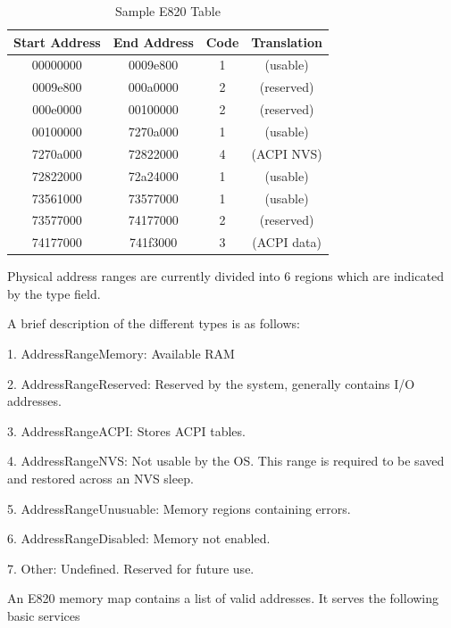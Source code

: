 \setlength{\belowcaptionskip}{-10pt}

\begin{table}[H]
  \centering
  \begin{tabular}{|c|c|c|c|}
      \hline
      Start Address & End Address & Code & Translation \\
      \hline 
      \hline
      00000000 & 0009e800 & 1 & (usable) \\
      \hline 
      0009e800 & 000a0000 & 2 & (reserved) \\
      \hline 
      000e0000 & 00100000 & 2 & (reserved) \\
      \hline 
      00100000 & 7270a000 & 1 & (usable) \\
      \hline 
      7270a000 & 72822000 & 4 & (ACPI NVS) \\
      \hline 
      72822000 & 72a24000 & 1 & (usable) \\
      \hline 
      73561000 & 73577000 & 1 & (usable) \\
      \hline 
      73577000 & 74177000 & 2 & (reserved) \\
      \hline
      74177000 & 741f3000 & 3 & (ACPI data)  \\
      \hline
  \end{tabular}
  \caption{Sample E820 Table}
  \label{tab:e820table}
\end{table}



Physical address ranges are currently divided into 6 regions which are indicated by the type field.

A brief description of the different types is as follows:

1. AddressRangeMemory: Available RAM

2. AddressRangeReserved: Reserved by the system, generally contains I/O addresses.

3. AddressRangeACPI: Stores ACPI tables.

4. AddressRangeNVS: Not usable by the OS. This range is required to be saved and restored across an NVS sleep.

5. AddressRangeUnusuable: Memory regions containing errors.

6. AddressRangeDisabled: Memory not enabled.

7. Other: Undefined. Reserved for future use.

An E820 memory map contains a list of valid addresses. It serves the following basic services

